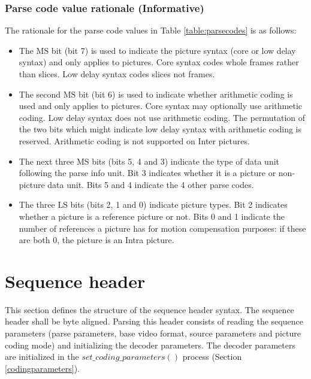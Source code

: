 \begin{informative*}
\subsubsection{Parse code value rationale (Informative)}

The rationale for the parse code values in Table \ref{table:parsecodes} is as follows:
\begin{itemize}
\item The MS bit (bit 7) is used to indicate the picture syntax (core or low delay syntax) 
and only applies to pictures. Core syntax codes whole frames rather than slices. Low delay syntax codes slices not frames. 
\item The second MS bit (bit 6) is used to indicate whether arithmetic coding is used and only applies to pictures. Core syntax may optionally use arithmetic coding. Low delay syntax does not use arithmetic coding. The permutation of the two bits which might indicate low delay syntax with arithmetic coding is reserved. Arithmetic coding is not supported on
Inter pictures.
\item The next three MS bits (bits 5, 4 and 3) indicate the type of data unit following the parse info unit. Bit 3 indicates whether it is a picture or non-picture data unit. Bits 5 and 4 indicate the 4 other parse codes.
\item The three LS bits (bits 2, 1 and 0) indicate picture types. Bit 2 indicates whether a picture
is a reference picture or not. Bits 0 and 1 indicate the number of references a picture has
for motion compensation purposes: if these are both 0, the picture is an Intra picture.
\end{itemize}

\end{informative*}

\clearpage
\section{Sequence header}
\label{sequenceheader}

This section defines the structure of the sequence header syntax. 
The sequence header shall be byte aligned. 
Parsing this header consists of reading the sequence parameters 
(parse parameters, base video format, source parameters and 
picture coding mode) and initializing the decoder parameters. The decoder 
parameters are initialized in the $set\_coding\_parameters()$ process (Section 
\ref{codingparameters}).

